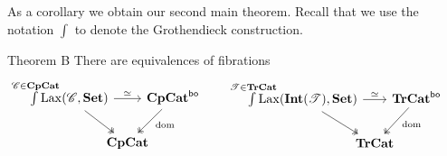 \documentclass[11pt,oneside,article]{memoir}
\begin{document}
As a corollary we obtain our second main theorem. Recall that we use the notation $\int$ to denote the Grothendieck construction.
\begin{named}{Theorem B}
      \label{thm:TheoremB}
   There are equivalences of fibrations
   \begin{equation*}
      \begin{tikzcd}[column sep=-1em]
         \int\limits^{\mathclap{\cat{C}\in\CompCat}} \Lax(\cat{C},\Set)
               \ar[rr,"\equiv"] \ar[dr,two heads]
            && \CompCat^{\bo} \ar[dl,two heads,"\dom" pos=.4] \\
         & \CompCat &
      \end{tikzcd}
      \qquad\quad
      \begin{tikzcd}[column sep=-1em]
         \int\limits^{\mathclap{\cat{T}\in\TrCat}} \Lax(\Int(\cat{T}),\Set)
               \ar[rr,"\equiv"] \ar[dr,two heads]
            && \TrCat^{\bo} \ar[dl,two heads,"\dom" pos=.4] \\
         & \TrCat &
      \end{tikzcd}
   \end{equation*}
\end{named}
\end{document}
